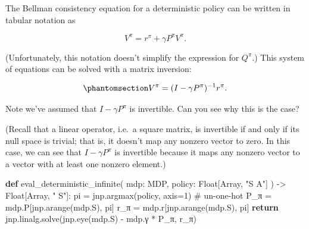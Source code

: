 \documentclass[
  letterpaper,
  DIV=11,
  numbers=noendperiod]{scrreprt}
\newenvironment{Shaded}{\begin{snugshade}}{\end{snugshade}}
\newcommand{\CommentTok}[1]{\textcolor[rgb]{0.37,0.37,0.37}{#1}}
\newcommand{\ControlFlowTok}[1]{\textcolor[rgb]{0.00,0.23,0.31}{\textbf{#1}}}
\newcommand{\DecValTok}[1]{\textcolor[rgb]{0.68,0.00,0.00}{#1}}
\newcommand{\KeywordTok}[1]{\textcolor[rgb]{0.00,0.23,0.31}{\textbf{#1}}}
\newcommand{\NormalTok}[1]{\textcolor[rgb]{0.00,0.23,0.31}{#1}}
\newcommand{\OperatorTok}[1]{\textcolor[rgb]{0.37,0.37,0.37}{#1}}
\newcommand{\StringTok}[1]{\textcolor[rgb]{0.13,0.47,0.30}{#1}}
\theoremstyle{plain}
\theoremstyle{plain}
\theoremstyle{definition}
\theoremstyle{definition}
\theoremstyle{remark}
\begin{document}
The Bellman consistency equation for a deterministic policy can be
written in tabular notation as

\[V^\pi = r^\pi + \gamma P^\pi V^\pi.\]

(Unfortunately, this notation doesn't simplify the expression for
\(Q^\pi\).) This system of equations can be solved with a matrix
inversion:

\begin{equation}\phantomsection\label{eq-matrix_inversion_pe}{
V^\pi = (I - \gamma P^\pi)^{-1} r^\pi.
}\end{equation}

Note we've assumed that \(I - \gamma P^\pi\) is invertible. Can you see
why this is the case?

(Recall that a linear operator, i.e.~a square matrix, is invertible if
and only if its null space is trivial; that is, it doesn't map any
nonzero vector to zero. In this case, we can see that
\(I - \gamma P^\pi\) is invertible because it maps any nonzero vector to
a vector with at least one nonzero element.)

\begin{Shaded}
\begin{Highlighting}[]
\KeywordTok{def}\NormalTok{ eval\_deterministic\_infinite(}
\NormalTok{    mdp: MDP, policy: Float[Array, }\StringTok{"S A"}\NormalTok{]}
\NormalTok{) }\OperatorTok{{-}\textgreater{}}\NormalTok{ Float[Array, }\StringTok{" S"}\NormalTok{]:}
\NormalTok{    pi }\OperatorTok{=}\NormalTok{ jnp.argmax(policy, axis}\OperatorTok{=}\DecValTok{1}\NormalTok{)  }\CommentTok{\# un{-}one{-}hot}
\NormalTok{    P\_π }\OperatorTok{=}\NormalTok{ mdp.P[jnp.arange(mdp.S), pi]}
\NormalTok{    r\_π }\OperatorTok{=}\NormalTok{ mdp.r[jnp.arange(mdp.S), pi]}
    \ControlFlowTok{return}\NormalTok{ jnp.linalg.solve(jnp.eye(mdp.S) }\OperatorTok{{-}}\NormalTok{ mdp.γ }\OperatorTok{*}\NormalTok{ P\_π, r\_π)}
\end{Highlighting}
\end{Shaded}
\end{document}
